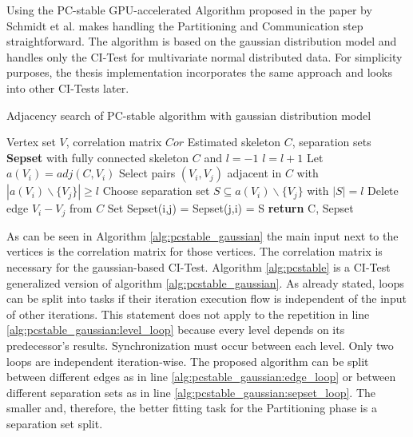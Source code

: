 Using the PC-stable GPU-accelerated Algorithm proposed in the paper by Schmidt et al. \cite{schmidtOrderIndependentConstraintBasedCausal2018} makes handling the Partitioning and Communication step straightforward. The algorithm is based on the gaussian distribution model and handles only the CI-Test for multivariate normal distributed data. For simplicity purposes, the thesis implementation incorporates the same approach and looks into other CI-Tests later.

\begin{algorithm}
    \caption{Adjacency search of PC-stable algorithm with gaussian distribution model \cite{schmidtOrderIndependentConstraintBasedCausal2018, colomboOrderIndependentConstraintBasedCausal}}
    \label{alg:pcstable_gaussian}
    \begin{algorithmic}[1]
    \Require Vertex set $V$, correlation matrix $Cor$
    \Ensure Estimated skeleton $C$, separation sets \textbf{Sepset}
    \State with fully connected skeleton $C$ and $l = -1$
    \Repeat \label{alg:pcstable_gaussian:level_loop}
        \State $l=l+1$
            \State Let $a(V_i) = adj(C,V_i)$ \label{alg:pcstable_gaussian:adj}
        \EndFor
        \Repeat \label{alg:pcstable_gaussian:edge_loop}
            \State Select pairs $(V_i,V_j)$ adjacent in $C$ with $|a(V_i)\backslash\{V_j\}| \geq l$
            \Repeat \label{alg:pcstable_gaussian:sepset_loop}
                \State Choose separation set $S \subseteq a(V_i ) \backslash \{V_j\}$ with $| S | = l$
                    \State Delete edge $V_i - V_j$ from $C$
                    \State Set Sepset(i,j) = Sepset(j,i) = S
                \EndIf
    \State \textbf{return} C, Sepset
    \end{algorithmic}
\end{algorithm}

As can be seen in Algorithm \ref{alg:pcstable_gaussian} the main input next to the vertices is the correlation matrix for those vertices. The correlation matrix is necessary for the gaussian-based CI-Test. Algorithm \ref{alg:pcstable} is a CI-Test generalized version of algorithm \ref{alg:pcstable_gaussian}.
As already stated, loops can be split into tasks if their iteration execution flow is independent of the input of other iterations. This statement does not apply to the repetition in line \ref{alg:pcstable_gaussian:level_loop} because every level depends on its predecessor's results. Synchronization must occur between each level.
Only two loops are independent iteration-wise. The proposed algorithm can be split between different edges as in line \ref{alg:pcstable_gaussian:edge_loop} or between different separation sets as in line \ref{alg:pcstable_gaussian:sepset_loop}. The smaller and, therefore, the better fitting task for the Partitioning phase is a separation set split.

